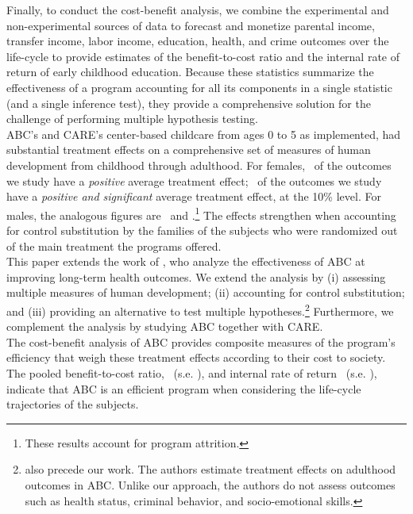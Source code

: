\noindent Finally, to conduct the cost-benefit analysis, we combine the experimental and non-experimental sources of data to forecast and monetize parental income, transfer income, labor income, education, health, and crime outcomes over the life-cycle to provide estimates of the benefit-to-cost ratio and the internal rate of return of early childhood education. Because these statistics summarize the effectiveness of a program accounting for all its components in a single statistic (and a single inference test), they provide a comprehensive solution for the challenge of performing multiple hypothesis testing.\\

\noindent ABC's and CARE's center-based childcare from ages 0 to 5 as implemented, had substantial treatment effects on a comprehensive set of measures of human development from childhood through adulthood. For females, \positivef\ of the outcomes we study have a \textit{positive} average treatment effect; \positivesf\ of the outcomes we study have a \textit{positive and significant} average treatment effect, at the 10\% level. For males, the analogous figures are \positivem\ and \positivesm.\footnote{These results account for program attrition.} The effects strengthen when accounting for control substitution by the families of the subjects who were randomized out of the main treatment  the programs offered.\\

\noindent This paper extends the work of \citet{Campbell_Conti_etal_2014_EarlyChildhoodInvestments}, who analyze the effectiveness of ABC at improving long-term health outcomes. We extend the analysis by (i) assessing multiple measures of human development; (ii) accounting for control substitution; and (iii) providing an alternative to test multiple hypotheses.\footnote{\cite{Campbell_Pungello_etal_2012_DP} also precede our work. The authors estimate treatment effects on adulthood outcomes in ABC. Unlike our approach, the authors do not assess outcomes such as health status, criminal behavior, and socio-emotional skills.} Furthermore, we complement the analysis by studying ABC together with CARE.\\ 

\noindent The cost-benefit analysis of ABC provides composite measures of the program's efficiency that weigh these treatment effects according to their cost to society. The pooled benefit-to-cost ratio, \bcp\ (s.e. \bcsep), and internal rate of return \irrp\ (s.e. \irrsep), indicate that ABC is an efficient program when considering the life-cycle trajectories of the subjects. \\

